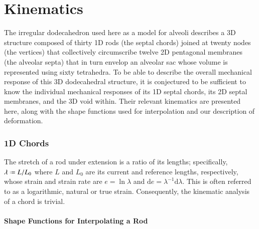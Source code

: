 \part{Kinematics}
\label{partKinematics}

The irregular dodecahedron used here as a model for alveoli describes a 3D structure composed of thirty 1D rods (the septal chords) joined at twenty nodes (the vertices) that collectively circumscribe twelve 2D pentagonal membranes (the alveolar septa) that in turn envelop an alveolar sac whose volume is represented using sixty tetrahedra.  To be able to describe the overall mechanical response of this 3D dodecahedral structure, it is conjectured to be sufficient to know the individual mechanical responses of its 1D septal chords, its 2D septal membranes, and the 3D void within.  Their relevant kinematics are presented here, along with the shape functions used for interpolation and our description of deformation.

\section{1D Chords}

The stretch of a rod under extension is a ratio of its lengths; specifically, $\lambda \defeq L / L_0$ where $L$ and $L_0$ are its current and reference lengths, respectively, whose strain and strain rate are $e = \ln \lambda$ and $\mathrm{d} e = \lambda^{-1} \mathrm{d} \lambda$.  This is often referred to as a logarithmic, natural or true strain.  Consequently, the kinematic analysis of a chord is trivial.

\subsection{Shape Functions for Interpolating a Rod}

